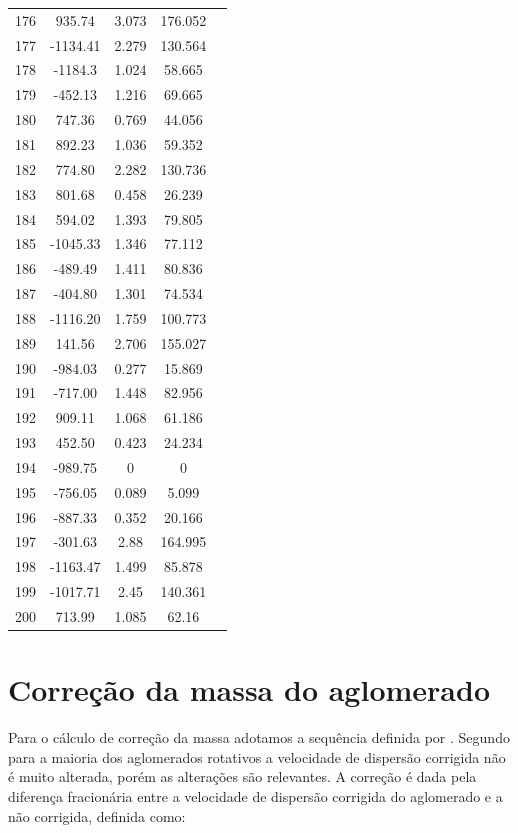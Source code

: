 {\begin{longtable}{ccccc}
176 & 935.74 & 3.073 & 176.052 \\
177 & -1134.41 & 2.279 & 130.564 \\
178 & -1184.3 & 1.024 & 58.665 \\
179 & -452.13 & 1.216 & 69.665 \\
180 & 747.36 & 0.769 & 44.056 \\
181 & 892.23 & 1.036 & 59.352 \\
182 & 774.80 & 2.282 & 130.736 \\
183 & 801.68 & 0.458 & 26.239 \\
184 & 594.02 & 1.393 & 79.805 \\
185 & -1045.33 & 1.346 & 77.112 \\
186 & -489.49 & 1.411 & 80.836 \\
187 & -404.80 & 1.301 & 74.534 \\
188 & -1116.20 & 1.759 & 100.773 \\
189 & 141.56 & 2.706 & 155.027 \\
190 & -984.03 & 0.277 & 15.869 \\
191 & -717.00 & 1.448 & 82.956 \\
192 & 909.11 & 1.068 & 61.186 \\
193 & 452.50 & 0.423 & 24.234 \\
194 & -989.75 & 0 & 0 \\
195 & -756.05 & 0.089 & 5.099 \\
196 & -887.33 & 0.352 & 20.166 \\
197 & -301.63 & 2.88 & 164.995 \\
198 & -1163.47 & 1.499 & 85.878 \\
199 & -1017.71 & 2.45 & 140.361 \\
200 & 713.99 & 1.085 & 62.16 \\ \hline
\end{longtable}
}

\section{Correção da massa do aglomerado}

Para o cálculo de correção da massa adotamos a sequência definida por . Segundo  para a maioria dos aglomerados rotativos a velocidade de dispersão corrigida não é muito alterada, porém as alterações são relevantes. A correção é dada pela diferença fracionária entre a velocidade de dispersão corrigida do aglomerado e a não corrigida, definida como:

